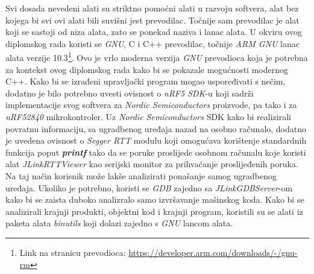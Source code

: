 Svi dosada nevedeni alati su striktno pomoćni alati u razvoju softvera, alat bez kojega bi svi ovi alati bili suvišni jest prevodilac. Točnije sam prevodilac je alat koji se sastoji od niza alata, zato se ponekad naziva i lanac alata. U okviru ovog diplomskog rada koristi se \textit{GNU}, C i C++ prevodilac, točnije \textit{ARM GNU} lanac alata verzije 10.3\footnote{Link na stranicu prevodioca: \hyperref[https://developer.arm.com/downloads/-/gnu-rm]{https://developer.arm.com/downloads/-/gnu-rm}}. Ovo je vrlo moderna verzija \textit{GNU} prevodioca koja je potrebna za kontekst ovog diplomskog rada kako bi se pokazale mogućnosti modernog C++. Kako bi se izrađeni upravljački program mogao uspoređivati s nečim, dodatno je bilo potrebno uvesti ovisnost o \textit{nRF5 SDK}-u koji sadrži implementacije svog softvera za \textit{Nordic Semiconductors} proizvode, pa tako i za \textit{nRF52840} mikrokontroler. Uz \textit{Nordic Semiconductors} SDK kako bi realizirali povratnu informaciju, sa ugradbenog uređaja nazad na osobno računalo, dodatno je uvedena ovisnost o \textit{Segger RTT} modulu koji omogućava korištenje standardnih funkcija poput \textbf{\textit{printf}} tako da se poruke proslijede osobnom računalu koje koristi alat \textit{JLinkRTTViewer} kao serijski monitor za prihvaćanje proslijeđenih poruka. Na taj način korisnik može lakše analizirati ponašanje samog ugradbenog uređaja. Ukoliko je potrebno, koristi se \textit{GDB} zajedno sa \textit{JLinkGDBServer}-om kako bi se zaista duboko analizralo samo izvršavanje mašinskog koda. Kako bi se analizirali krajnji produkti, objektni kod i krajnji program, koristili su se alati iz paketa alata \textit{binutils} koji dolazi zajedno s \textit{GNU} lancom alata. 

